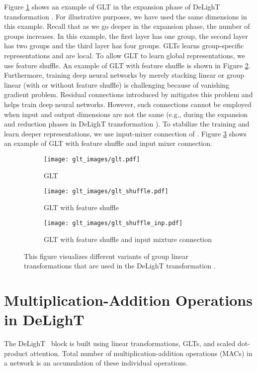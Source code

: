 Figure \ref{fig:glt_app} shows an example of GLT in the expansion phase of DeLighT transformation . For illustrative purposes, we have used the same dimensions in this example. Recall that as we go deeper in the expansion phase, the number of groups increases. In this example, the first layer has one group, the second layer has two groups and the third layer has four groups. GLTs learns group-specific representations and are local.  To allow GLT to learn global representations, we use feature shuffle. An example of GLT with feature shuffle is shown in Figure \ref{fig:glt_shuff_app}. Furthermore, training deep neural networks by merely stacking linear or group linear (with or without feature shuffle) is challenging because of vanishing gradient problem. Residual connections introduced by \citet{he2016deep} mitigates this problem and helps train deep neural networks. However, such connections cannot be employed when input and output dimensions are not the same (e.g., during the expansion and reduction phases in DeLighT transformation ). To stabilize the training and learn deeper representations, we use input-mixer connection of \citet{mehta2020DeFINE}. Figure \ref{fig:glt_shuff_mix_app} shows an example of GLT with feature shuffle and input mixer connection.

\begin{figure}[h!]
    \centering
    \begin{subfigure}[b]{0.3\columnwidth}
    \texttt{[image: glt\_images/glt.pdf]}
    \caption{GLT}
    \label{fig:glt_app}
    \end{subfigure}
    \hfill
    \begin{subfigure}[b]{0.3\columnwidth}
        \texttt{[image: glt\_images/glt\_shuffle.pdf]}
        \caption{GLT with feature shuffle}
        \label{fig:glt_shuff_app}
    \end{subfigure}
    \hfill
    \begin{subfigure}[b]{0.33\columnwidth}
        \texttt{[image: glt\_images/glt\_shuffle\_inp.pdf]}
        \caption{GLT with feature shuffle and input mixture connection}
        \label{fig:glt_shuff_mix_app}
    \end{subfigure}
    \caption{This figure visualizes different variants of group linear transformations that are used in the DeLighT transformation .}
    \label{fig:glt_vis}
\end{figure}

\section{Multiplication-Addition Operations in DeLighT }
\label{sec:appendix_mac}
The DeLighT ~block is built using linear transformations, GLTs, and scaled dot-product attention. Total number of multiplication-addition operations (MACs) in a network is an accumulation of these individual operations. 

